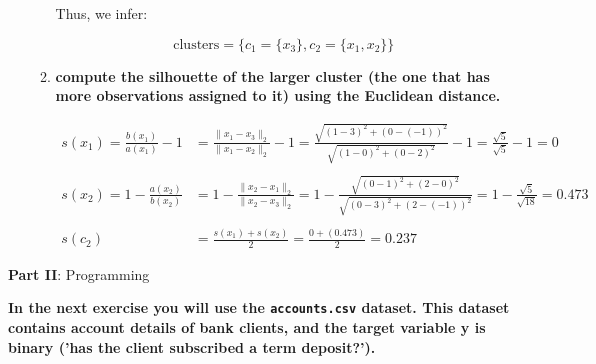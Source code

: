 \documentclass[12pt]{article}
\begin{document}
\begin{enumerate}
\begin{enumerate}[label=\alph*)]
        Thus, we infer:

        \begin{equation*}
                \text{clusters} = \{c_1=\{x_3\},c_2=\{x_1, x_2\}\}
        \end{equation*}

        \item \textbf{compute the silhouette of the larger cluster (the one that has more observations
        assigned to it) using the Euclidean distance.}

        \begin{equation*}
            \begin{aligned}
                s(x_1) = \frac{b(x_1)}{a(x_1)} - 1 &= \frac{\|x_1-x_3\|_2}{\|x_1-x_2\|_2} - 1 = \frac{\sqrt{(1-3)^2+(0-(-1))^2}}{\sqrt{(1-0)^2+(0-2)^2}} - 1 = \frac{\sqrt{5}}{\sqrt{5}} - 1 = 0\\
                \\
                s(x_2) = 1 - \frac{a(x_2)}{b(x_2)} &= 1 - \frac{\|x_2-x_1\|_2}{\|x_2-x_3\|_2} = 1 - \frac{\sqrt{(0-1)^2+(2-0)^2}}{\sqrt{(0-3)^2+(2-(-1))^2}} = 1 - \frac{\sqrt{5}}{\sqrt{18}} = 0.473\\
                \\
                s(c_2) &= \frac{s(x_1) + s(x_2)}{2} = \frac{0+(0.473)}{2} = 0.237
            \end{aligned}
        \end{equation*}

    \end{enumerate}
\end{enumerate}

\vspace{20pt}
\large{\textbf{Part II}: Programming}\normalsize

\vspace{20pt}
\textbf{In the next exercise you will use the \texttt{accounts.csv} dataset. This dataset contains account details
of bank clients, and the target variable y is binary ('has the client subscribed a term deposit?').}
\end{document}
